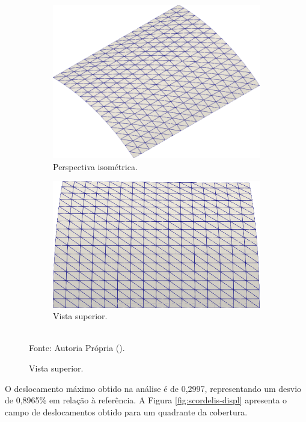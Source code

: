 \begin{figure}[h!]
    \centering
    \caption{\textit{Scordelis-Lo roof} - Malha utilizada.}
    \begin{subfigure}{0.35\textwidth}
        \includegraphics[width=\linewidth]{Figuras/scordelis/malha1.png}
        \caption{Perspectiva isométrica.}
    \end{subfigure}
    \begin{subfigure}{0.35\textwidth}
        \includegraphics[width=\linewidth]{Figuras/scordelis/malha2.png}
        \caption{Vista superior.}
    \end{subfigure}
    \\Fonte: Autoria Própria (\the\year).
    \label{fig:scordelis-mesh}
\end{figure}

O deslocamento máximo obtido na análise é de 0,2997, representando um desvio de 0,8965\% em relação à referência. A Figura \ref{fig:scordelis-displ} apresenta o campo de deslocamentos obtido para um quadrante da cobertura.

